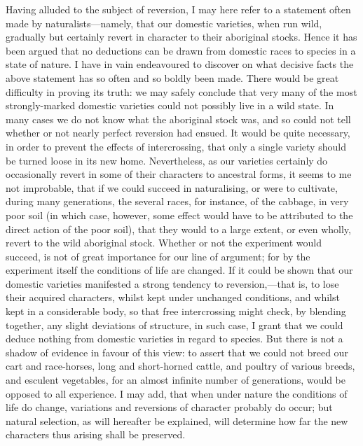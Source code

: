 \documentclass{book}
\begin{document}
Having alluded to the subject of reversion, I may here refer to a statement
often made by naturalists---namely, that our domestic varieties, when run
wild, gradually but certainly revert in character to their aboriginal stocks.
Hence it has been argued that no deductions can be drawn from domestic races to
species in a state of nature. I have in vain endeavoured to discover on what
decisive facts the above statement has so often and so boldly been made. There
would be great difficulty in proving its truth: we may safely conclude that
very many of the most strongly-marked domestic varieties could not possibly
live in a wild state. In many cases we do not know what the aboriginal stock
was, and so could not tell whether or not nearly perfect reversion had ensued.
It would be quite necessary, in order to prevent the effects of intercrossing,
that only a
single variety should be turned loose in its new home. Nevertheless, as our
varieties certainly do occasionally revert in some of their characters to
ancestral forms, it seems to me not improbable, that if we could succeed in
naturalising, or were to cultivate, during many generations, the several races,
for instance, of the cabbage, in very poor soil (in which case, however, some
effect would have to be attributed to the direct action of the poor soil), that
they would to a large extent, or even wholly, revert to the wild aboriginal
stock. Whether or not the experiment would succeed, is not of great importance
for our line of argument; for by the experiment itself the conditions of life
are changed. If it could be shown that our domestic varieties manifested a
strong tendency to reversion,---that is, to lose their acquired characters,
whilst kept under unchanged conditions, and whilst kept in a considerable body,
so that free intercrossing might check, by blending together, any slight
deviations of structure, in such case, I grant that we could deduce nothing
from domestic varieties in regard to species. But there is not a shadow of
evidence in favour of this view: to assert that we could not breed our cart and
race-horses, long and short-horned cattle, and poultry of various breeds, and
esculent vegetables, for an almost infinite number of generations, would be
opposed to all experience. I may add, that when under nature the conditions of
life do change, variations and reversions of character probably do occur; but
natural selection, as will hereafter be explained, will determine how far the
new characters thus arising shall be preserved.
\end{document}
